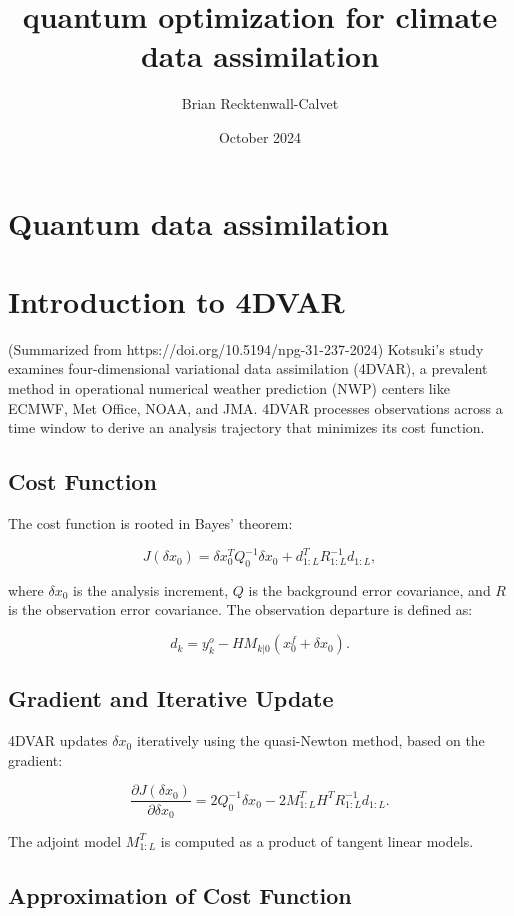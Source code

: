 \documentclass{article}
\title{quantum optimization for climate data assimilation}
\author{Brian Recktenwall-Calvet}
\date{October 2024}
\begin{document}
\maketitle
\section{Quantum data assimilation}

\section{Introduction to 4DVAR}

(Summarized from https://doi.org/10.5194/npg-31-237-2024) Kotsuki's study examines four-dimensional variational data assimilation (4DVAR), a prevalent method in operational numerical weather prediction (NWP) centers like ECMWF, Met Office, NOAA, and JMA. 4DVAR processes observations across a time window to derive an analysis trajectory that minimizes its cost function.

\subsection{Cost Function}

The cost function is rooted in Bayes' theorem:

\[
J (\delta x_0) = \delta x_0^T Q_0^{-1} \delta x_0 + d_{1:L}^T R_{1:L}^{-1} d_{1:L},
\]

where \( \delta x_0 \) is the analysis increment, \( Q \) is the background error covariance, and \( R \) is the observation error covariance. The observation departure is defined as:

\[
d_k = y^o_k - H M_{k|0} \left( x^f_0 + \delta x_0 \right).
\]

\subsection{Gradient and Iterative Update}

4DVAR updates \( \delta x_0 \) iteratively using the quasi-Newton method, based on the gradient:

\[
\frac{\partial J (\delta x_0)}{\partial \delta x_0} = 2 Q_0^{-1} \delta x_0 - 2 M^T_{1:L} H^T R_{1:L}^{-1} d_{1:L}.
\]

The adjoint model \( M^T_{1:L} \) is computed as a product of tangent linear models.

\subsection{Approximation of Cost Function}
\end{document}
